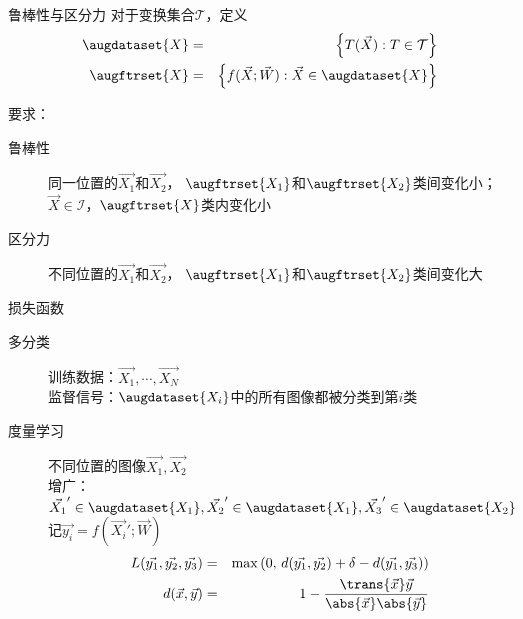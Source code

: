 \documentclass {beamer}
\begin{document}
\begin{frame}{鲁棒性与区分力}
    对于变换集合$\mathcal{T}$，定义
    \begin{eqnarray}
        \augdataset{X} &=& \left\{T(\vec{X}): T\in\mathcal{T}\right\}
            \nonumber \\
        \augftrset{X} &=& \left\{f(\vec{X};\vec{W}):
        \vec{X}\in\augdataset{X}\right\} \label{eqn:cnn:augdef}
    \end{eqnarray}

    要求：
    \begin{description}
        \item[鲁棒性] 同一位置的$\vec{X_1}$和$\vec{X_2}$，
            $\augftrset{X_1}$和$\augftrset{X_2}$类间变化\alert{小}；
            $\vec{X}\in\mathcal{I}$，$\augftrset{X}$类内变化小
        \item[区分力] 不同位置的$\vec{X_1}$和$\vec{X_2}$，
            $\augftrset{X_1}$和$\augftrset{X_2}$类间变化\alert{大}
    \end{description}

\end{frame}

\begin{frame}{损失函数}
    \begin{description}
        \item[多分类]
            训练数据：$\vec{X_1},\cdots,\vec{X_N}$ \\
            监督信号：$\augdataset{X_i}$中的所有图像都被分类到第$i$类 \\
            \pause
        \item[度量学习]
            不同位置的图像$\vec{X_1}, \vec{X_2}$ \\
            增广： $\vec{X_1}' \in \augdataset{X_1}, \vec{X_2}' \in \augdataset{X_1},
            \vec{X_3}' \in \augdataset{X_2}$ \\
            记$\vec{y_i}=f(\vec{X_i}';\vec{W})$
            \begin{eqnarray}
                L(\vec{y_1}, \vec{y_2}, \vec{y_3}) &=&
                    \max\left(0,\,
                        d(\vec{y_1}, \vec{y_2}) + \delta - d(\vec{y_1}, \vec{y_3})
                    \right) \nonumber \\
                d(\vec{x}, \vec{y}) &=& 1 -
                    \frac{\trans{\vec{x}}\vec{y}}{\abs{\vec{x}}\abs{\vec{y}}}
                \label{eqn:cnn:mtrc:loss}
            \end{eqnarray}
    \end{description}
\end{frame}
\end{document}
